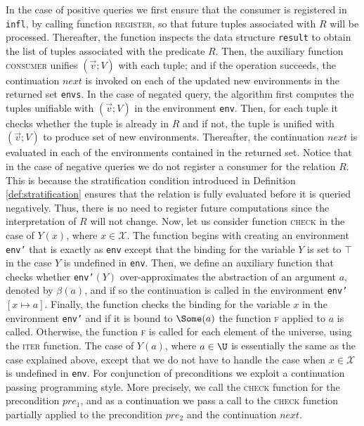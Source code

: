 In the case of positive queries we first ensure that the consumer is
registered in {\tt infl}, by calling function \textsc{register}, so
that future tuples associated with $R$ will be processed. Thereafter,
the function inspects the data structure \texttt{result} to obtain the
list of tuples associated with the predicate $R$. Then, the auxiliary
function \textsc{consumer} unifies $(\vec{v};V)$ with each tuple; and
if the operation succeeds, the continuation $next$ is invoked on each
of the updated new environments in the returned set \texttt{envs}.
In the case of negated query, the algorithm first computes the tuples
unifiable with $(\vec{v};V)$ in the environment \texttt{env}. Then,
for each tuple it checks whether the tuple is already in $R$ and if
not, the tuple is unified with $(\vec{v};V)$ to produce set of new
environments. Thereafter, the continuation $next$ is evaluated in each
of the environments contained in the returned set. Notice that in the
case of negative queries we do not register a consumer for the
relation $R$. This is because the stratification condition introduced
in Definition \ref{def:stratification} ensures that the relation is
fully evaluated before it is queried negatively. Thus, there is no
need to register future computations since the interpretation of $R$
will not change.
Now, let us consider function \textsc{check} in the case of $Y(x)$,
where $x \in \mathcal{X}$. The function begins with creating an
environment {\tt env'} that is exactly as {\tt env} except that the
binding for the variable $Y$ is set to $\top$ in the case $Y$ is
undefined in {\tt env}. Then, we define an auxiliary function that
checks whether {\tt env'}$(Y)$ over-approximates the abstraction of an
argument $a$, denoted by $\beta(a)$, and if so the continuation is
called in the environment {\tt env'}$[x \mapsto a]$. Finally, the
function checks the binding for the variable $x$ in the environment
{\tt env'} and if it is bound to $\Some(a)$ the function \textsc{f}
applied to $a$ is called. Otherwise, the function \textsc{f} is called
for each element of the universe, using the \textsc{iter}
function. The case of $Y(a)$, where $a \in \U$ is essentially the same
as the case explained above, except that we do not have to handle the
case when $x \in \mathcal{X}$ is undefined in {\tt env}.
For conjunction of preconditions we exploit a continuation passing
programming style. More precisely, we call the \textsc{check} function
for the precondition $pre_1$, and as a continuation we pass a call to
the \textsc{check} function partially applied to the precondition
$pre_2$ and the continuation $next$.
